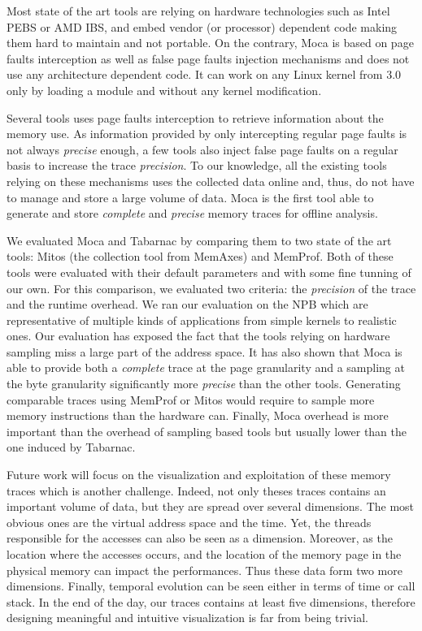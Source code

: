 Most state of the art tools are relying on hardware technologies such as \gls{Intel} \gls{PEBS} or \gls{AMD} \gls{IBS}, and embed vendor (or processor) dependent code making them hard to maintain and not portable.
On the contrary, \gls{Moca} is based on page faults interception as well as false page faults injection mechanisms and does not use any architecture dependent code.
It can work on any \gls{Linux} kernel from $3.0$ only by loading a module and without any kernel modification.

Several tools uses page faults interception to retrieve information about the memory use.
As information provided by only intercepting regular page faults is not always \emph{precise} enough, a few tools also inject false page faults on a regular basis to increase the trace \emph{precision}.
To our knowledge, all the existing tools relying on these mechanisms uses the collected data online and, thus, do not have to manage and store a large volume of data.
\gls{Moca} is the first tool able to generate and store \emph{complete} and \emph{precise} memory traces for offline analysis.

We evaluated \gls{Moca} and \gls{Tabarnac} by comparing them to two state of the art tools: \gls{Mitos} (the collection tool from \gls{MemAxes}) and \gls{MemProf}.
Both of these tools were evaluated with their default parameters and with some fine tunning of our own.
For this comparison, we evaluated two criteria: the \emph{precision} of the trace and the runtime overhead.
We ran our evaluation on the \gls{NPB} which are representative of multiple kinds of applications from simple kernels to realistic ones.
Our evaluation has exposed the fact that the tools relying on hardware sampling miss a large part of the address space.
It has also shown that \gls{Moca} is able to provide both a \emph{complete} trace at the page granularity and a sampling at the byte granularity significantly more \emph{precise} than the other tools.
Generating comparable traces using \gls{MemProf} or \gls{Mitos} would require to sample more memory instructions than the hardware can.
Finally, \gls{Moca} overhead is more important than the overhead of sampling based tools but usually lower than the one induced by \gls{Tabarnac}.

Future work will focus on the visualization and exploitation of these memory traces which is another challenge.
Indeed, not only theses traces contains an important volume of data, but they are spread over several dimensions.
The most obvious ones are the virtual address space and the time.
Yet, the threads responsible for the accesses can also be seen as a dimension.
Moreover, as the location where the accesses occurs, and the location of the memory page in the physical memory can impact the performances.
Thus these data form two more dimensions.
Finally, temporal evolution can be seen either in terms of time or call stack.
In the end of the day, our traces contains at least five dimensions, therefore designing meaningful and intuitive visualization is far from being trivial.

